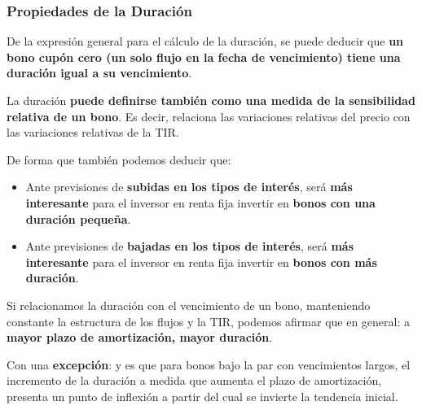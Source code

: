 \documentclass[
  letterpaper,
  DIV=11,
  numbers=noendperiod]{scrartcl}
\begin{document}
\hypertarget{propiedades-de-la-duraciuxf3n}{%
\subsubsection{Propiedades de la
Duración}\label{propiedades-de-la-duraciuxf3n}}

De la expresión general para el cálculo de la duración, se puede deducir
que \textbf{un bono cupón cero (un solo flujo en la fecha de
vencimiento) tiene una duración igual a su vencimiento}.

La duración \textbf{puede definirse también como una medida de la
sensibilidad relativa de un bono}. Es decir, relaciona las variaciones
relativas del precio con las variaciones relativas de la TIR.

De forma que también podemos deducir que:

\begin{itemize}
\item
  Ante previsiones de \textbf{subidas en los tipos de interés}, será
  \textbf{más interesante} para el inversor en renta fija invertir en
  \textbf{bonos con una duración pequeña}.
\item
  Ante previsiones de \textbf{bajadas en los tipos de interés}, será
  \textbf{más interesante} para el inversor en renta fija invertir en
  \textbf{bonos con más duración}.
\end{itemize}

Si relacionamos la duración con el vencimiento de un bono, manteniendo
constante la estructura de los flujos y la TIR, podemos afirmar que en
general: a \textbf{mayor plazo de amortización, mayor duración}.

\begin{tcolorbox}[enhanced jigsaw, colframe=quarto-callout-important-color-frame, opacityback=0, colback=white, leftrule=.75mm, left=2mm, breakable, arc=.35mm, rightrule=.15mm, toprule=.15mm, bottomrule=.15mm]
\begin{minipage}[t]{5.5mm}
\textcolor{quarto-callout-important-color}{\faExclamation}
\end{minipage}%
\begin{minipage}[t]{\textwidth - 5.5mm}

Con una \textbf{excepción}: y es que para bonos bajo la par con
vencimientos largos, el incremento de la duración a medida que aumenta
el plazo de amortización, presenta un punto de inflexión a partir del
cual se invierte la tendencia inicial.

\end{minipage}%
\end{tcolorbox}
\end{document}
